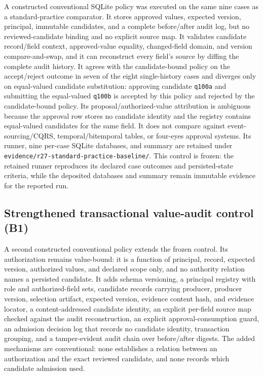 \documentclass[preprint,12pt,authoryear]{elsarticle}
\newcommand{\code}[1]{\nolinkurl{#1}}
\begin{document}
A constructed conventional SQLite policy was executed on the same nine cases as a
standard-practice comparator. It stores approved values, expected version,
principal, immutable candidates, and a complete before/after audit log, but no
reviewed-candidate binding and no explicit source map. It validates candidate
record/field context, approved-value equality, changed-field domain, and version
compare-and-swap, and it can reconstruct every field's source by diffing the
complete audit history. It agrees with the candidate-bound policy on the
accept/reject outcome in seven of the eight single-history cases and diverges only
on equal-valued candidate substitution: approving candidate \code{q100a} and
submitting the equal-valued \code{q100b} is accepted by this policy and rejected
by the candidate-bound policy. Its proposal/authorized-value attribution is
ambiguous because the approval row stores no candidate identity and the registry
contains equal-valued candidates for the same field. It does not compare against
event-sourcing/CQRS, temporal/bitemporal tables, or four-eyes approval systems.
Its runner, nine per-case SQLite databases, and summary are retained under
\code{evidence/r27-standard-practice-baseline/}. This control is frozen: the
retained runner reproduces its declared case outcomes and persisted-state
criteria, while the deposited databases and summary remain immutable evidence for
the reported run.

\subsection{Strengthened transactional value-audit control (B1)}
\label{app:strengthened-baseline}

A second constructed conventional policy extends the frozen control. Its
authorization remains value-bound: it is a function of principal, record,
expected version, authorized values, and declared scope only, and no authority
relation names a persisted candidate. It adds schema versioning, a principal
registry with role and authorized-field sets, candidate records carrying
producer, producer version, selection artifact, expected version, evidence content
hash, and evidence locator, a content-addressed candidate identity, an explicit
per-field source map checked against the audit reconstruction, an explicit
approval-consumption guard, an admission decision log that records no candidate
identity, transaction grouping, and a tamper-evident audit chain over
before/after digests. The added mechanisms are conventional: none establishes a
relation between an authorization and the exact reviewed candidate, and none
records which candidate admission used.
\end{document}
